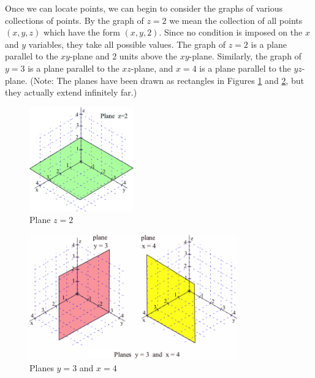 Once we can locate points, we can begin to consider the graphs of various collections of points. By the graph of $z=2$ we mean the collection of all points $(x,y,z)$ which have the form $(x,y,2)$. Since no condition is imposed on the $x$ and $y$ variables, they take all possible values. The graph of $z=2$ is a plane parallel to the $xy$-plane and 2 units above the $xy$-plane. Similarly, the graph of $y=3$ is a plane parallel to the $xz$-plane, and $x=4$ is a plane parallel to the $yz$-plane. (Note: The planes have been drawn as rectangles in Figures \ref{fig:4-1-z2} and \ref{fig:4-1-y3x4}, but they actually extend infinitely far.)
\begin{figure}[!ht]
  \centering
    \includegraphics[width=0.4\textwidth]{img/chap4/image008.png}
    \caption{Plane $z=2$}
    \label{fig:4-1-z2}
\end{figure}
\begin{figure}[!ht]
  \centering
    \includegraphics[width=0.8\textwidth]{img/chap4/image009.png}
    \caption{Planes $y=3$ and $x=4$}
    \label{fig:4-1-y3x4}
\end{figure}

